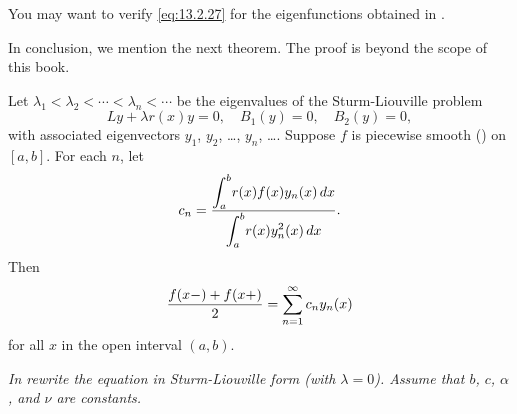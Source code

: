  You may want to verify \eqref{eq:13.2.27} for the eigenfunctions obtained in
.


In conclusion, we mention the next theorem. The proof is beyond the
scope of this book.

\begin{theorem}\label{thmtype:13.2.7}
Let $\lambda_{1}<\lambda_{2}<\cdots<\lambda_{n}<\cdots$  be the eigenvalues
of the Sturm-Liouville problem
\[
Ly+\lambda r(x)y=0,\quad B_{1}(y)=0,\quad B_{2}(y)=0,
\]
with associated eigenvectors $y_{1}$,  $y_{2}$, \dots, $y_{n}$, \dots.
 Suppose $f$  is piecewise smooth
() on $[a,b]$.  For each $n$, let
\[
c_{n}=\frac{\displaystyle{\int_{a}^{b}}r(x)f(x)y_{n}(x)\,dx}
{\displaystyle{\int_{a}^{b}}r(x)y_{n}^{2}(x)\,dx}.
\]
Then
\[
\frac{f(x-)+f(x+)}{2}=\sum_{n=1}^{\infty}c_{n}y_{n}(x)\index{Sturm-Liouville expansion}
\]
for all $x$ in the open interval $(a,b)$.
\end{theorem}

\exercises



\emph{In  rewrite the equation
in Sturm-Liouville form (with $\lambda=0$). Assume that $b$, $c$,
$\alpha$, and $\nu$ are constants.}

